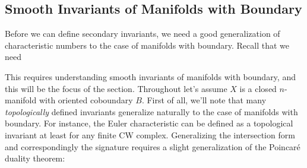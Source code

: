 \subsection{Smooth Invariants of Manifolds with Boundary}\label{sec:smooth-invariants-of-manifolds-with-boundary}

Before we can define secondary invariants, we need a good generalization of characteristic numbers to the case of manifolds with boundary. Recall that we need 


This requires understanding smooth invariants of manifolds with boundary, and this will be the focus of the section.
Throughout let's assume $X$ is a closed $n$-manifold with oriented coboundary $B$.
First of all, we'll note that many \emph{topologically} defined invariants generalize naturally to the case of manifolds with boundary. For instance, the Euler characteristic can be defined as a topological invariant at least for any finite CW complex.
Generalizing the intersection form and correspondingly the signature requires a slight generalization of the Poincar\'e duality theorem:

%
%

